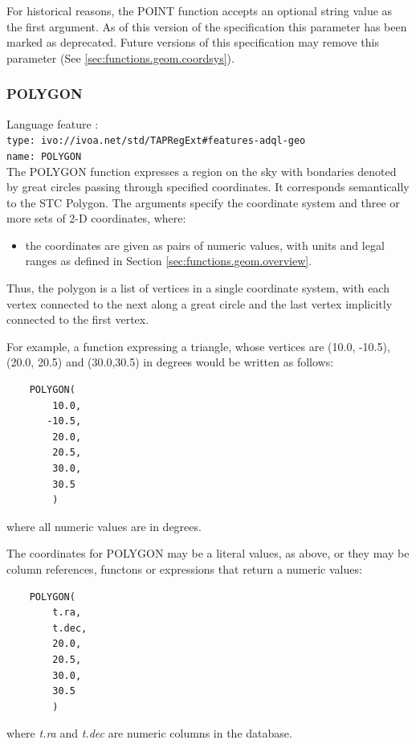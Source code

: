 \documentclass[11pt,a4paper]{ivoa}
\begin{document}
For historical reasons, the POINT function accepts an optional string
value as the first argument.
As of this version of the specification this parameter has been
marked as deprecated.
Future versions of this specification may remove this parameter
(See \ref{sec:functions.geom.coordsys}).

\subsubsection{POLYGON}
\label{sec:functions.geom.polygon}
{\footnotesize Language feature :}\\
{\footnotesize \verb|type: ivo://ivoa.net/std/TAPRegExt#features-adql-geo|}\\
{\footnotesize \verb|name: POLYGON|}\\

The POLYGON function expresses a region on the sky with bondaries denoted by great
circles passing through specified coordinates. It corresponds semantically
to the STC Polygon. The arguments specify the
coordinate system and three or more sets of 2-D coordinates, where:
\begin{itemize}
    \item the coordinates are given as pairs of numeric values, with units and legal ranges as defined in Section \ref{sec:functions.geom.overview}.
\end{itemize}

Thus, the polygon is a list of vertices in a single coordinate system, with
each vertex connected to the next along a great circle and the last vertex
implicitly connected to the first vertex.

For example, a function expressing a triangle, whose vertices are (10.0,
-10.5), (20.0, 20.5) and (30.0,30.5) in degrees would be written
as follows:
\begin{verbatim}
    POLYGON(
        10.0,
       -10.5,
        20.0,
        20.5,
        30.0,
        30.5
        )
\end{verbatim}
\noindent
where all numeric values are in degrees.

The coordinates for POLYGON may be a literal values, as above,
or they may be column references, functons or expressions that return
a numeric values:
\begin{verbatim}
    POLYGON(
        t.ra,
        t.dec,
        20.0,
        20.5,
        30.0,
        30.5
        )
\end{verbatim}
\noindent
where \textit{t.ra} and \textit{t.dec} are numeric columns in the database.
\end{document}
